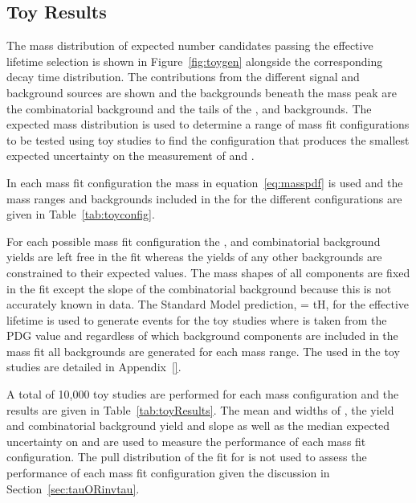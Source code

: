 {\subsection{Toy Results}
\label{sec:toyresults}

The mass distribution of expected number \bsmumu candidates passing the effective lifetime selection is shown in Figure~\ref{fig:toygen} alongside the corresponding decay time distribution. 
The contributions from the different signal and background sources are shown and the backgrounds beneath the \bs mass peak are the combinatorial background and the tails of the \bhh, \bdmum and \lambdab backgrounds. The expected mass distribution is used to determine a range of mass fit configurations to be tested using toy studies to find the configuration that produces the smallest expected uncertainty on the measurement of \tmumu and \Gmumu.



In each mass fit configuration the mass \pdf in equation~\ref{eq:masspdf} is used and the mass ranges and backgrounds included in the \pdf for the different configurations are given in Table~\ref{tab:toyconfig}.


For each possible mass fit configuration the \bsmumu, \bdmumu and combinatorial background yields are left free in the fit whereas the yields of any other backgrounds are constrained to their expected values. The mass shapes of all components are fixed in the \ml fit except the slope of the combinatorial background because this is not accurately known in data. 
The Standard Model prediction, \tmumu = tH, for the \bsmumu effective lifetime is used to generate events for the toy studies where \tH is taken from the PDG value and regardless of which background components are included in the mass fit all backgrounds are generated for each mass range. The \pdfs used in the toy studies are detailed in Appendix~\ref{}.

A total of 10,000 toy studies are performed for each mass configuration and the results are given in Table~\ref{tab:toyResults}. The mean and widths of \Gmumu, the \bsmumu yield and combinatorial background yield and slope as well as the median expected uncertainty on \tmumu and \Gmumu are used to measure the performance of each mass fit configuration. The pull distribution of the fit for \tmumu is not used to assess the performance of each mass fit configuration given the discussion in Section~\ref{sec:tauORinvtau}.



}
